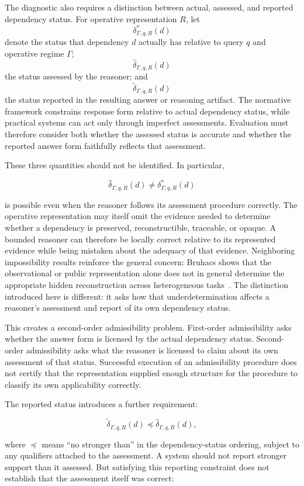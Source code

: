 \documentclass[11pt]{article}
\begin{document}
The diagnostic also requires a distinction between actual, assessed, and reported dependency status. For operative representation \(R\), let
\[
\delta^{*}_{\Gamma,q,R}(d)
\]
denote the status that dependency \(d\) actually has relative to query \(q\) and operative regime \(\Gamma\);
\[
\widehat{\delta}_{\Gamma,q,R}(d)
\]
the status assessed by the reasoner; and
\[
\widetilde{\delta}_{\Gamma,q,R}(d)
\]
the status reported in the resulting answer or reasoning artifact. The normative framework constrains response form relative to actual dependency status, while practical systems can act only through imperfect assessments. Evaluation must therefore consider both whether the assessed status is accurate and whether the reported answer form faithfully reflects that assessment.

These three quantities should not be identified. In particular,

\[
\widehat{\delta}_{\Gamma,q,R}(d)
\neq
\delta^{*}_{\Gamma,q,R}(d)
\]

is possible even when the reasoner follows its assessment procedure correctly. The operative representation may itself omit the evidence needed to determine whether a dependency is preserved, reconstructible, traceable, or opaque. A bounded reasoner can therefore be locally correct relative to its represented evidence while being mistaken about the adequacy of that evidence. Neighboring impossibility results reinforce the general concern: Bruhacs shows that the observational or public representation alone does not in general determine the appropriate hidden reconstruction across heterogeneous tasks~\cite{Bruhacs2026Limits}. The distinction introduced here is different: it asks how that underdetermination affects a reasoner's assessment and report of its own dependency status.

This creates a second-order admissibility problem. First-order admissibility asks whether the answer form is licensed by the actual dependency status. Second-order admissibility asks what the reasoner is licensed to claim about its own assessment of that status. Successful execution of an admissibility procedure does not certify that the representation supplied enough structure for the procedure to classify its own applicability correctly.

The reported status introduces a further requirement:

\[
\widetilde{\delta}_{\Gamma,q,R}(d)
\preceq
\widehat{\delta}_{\Gamma,q,R}(d),
\]

where \(\preceq\) means ``no stronger than'' in the dependency-status ordering, subject to any qualifiers attached to the assessment. A system should not report stronger support than it assessed. But satisfying this reporting constraint does not establish that the assessment itself was correct:
\end{document}
